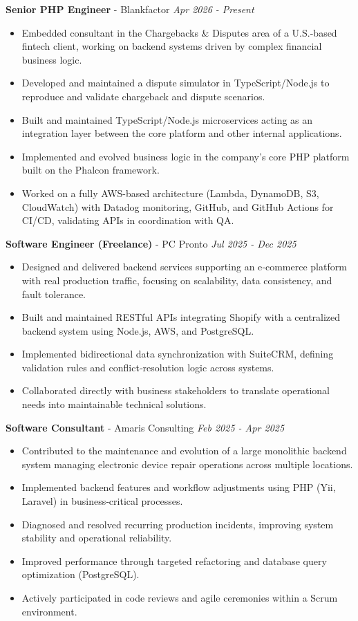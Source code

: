\documentclass[9pt,letterpaper]{extarticle}
\begin{document}
	\textbf{Senior PHP Engineer} - {Blankfactor}
	\hfill \textit{Apr 2026 - Present}
	\begin{itemize}
		\item Embedded consultant in the Chargebacks \& Disputes area of a U.S.-based fintech client, working on backend systems driven by complex financial business logic.
		\item Developed and maintained a dispute simulator in TypeScript/Node.js to reproduce and validate chargeback and dispute scenarios.
		\item Built and maintained TypeScript/Node.js microservices acting as an integration layer between the core platform and other internal applications.
		\item Implemented and evolved business logic in the company's core PHP platform built on the Phalcon framework.
		\item Worked on a fully AWS-based architecture (Lambda, DynamoDB, S3, CloudWatch) with Datadog monitoring, GitHub, and GitHub Actions for CI/CD, validating APIs in coordination with QA.
	\end{itemize}

	\textbf{Software Engineer (Freelance)} - {PC Pronto}
	\hfill \textit{Jul 2025 - Dec 2025}
	\begin{itemize}
		\item Designed and delivered backend services supporting an e‑commerce platform with real production traffic, focusing on scalability, data consistency, and fault tolerance.
		\item Built and maintained RESTful APIs integrating Shopify with a centralized backend system using Node.js, AWS, and PostgreSQL.
		\item Implemented bidirectional data synchronization with SuiteCRM, defining validation rules and conflict‑resolution logic across systems.
		\item Collaborated directly with business stakeholders to translate operational needs into maintainable technical solutions.
	\end{itemize}
	
	\textbf{Software Consultant} - {Amaris Consulting}
	\hfill \textit{Feb 2025 - Apr 2025}
	\begin{itemize}
		\item Contributed to the maintenance and evolution of a large monolithic backend system managing electronic device repair operations across multiple locations.
		\item Implemented backend features and workflow adjustments using PHP (Yii, Laravel) in business‑critical processes.
		\item Diagnosed and resolved recurring production incidents, improving system stability and operational reliability.
		\item Improved performance through targeted refactoring and database query optimization (PostgreSQL).
		\item Actively participated in code reviews and agile ceremonies within a Scrum environment.
	\end{itemize}
	
\end{document}
